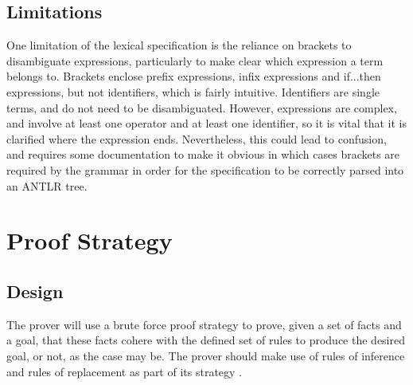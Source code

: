 \documentclass{l4proj}
\begin{document}


\subsection{Limitations}
One limitation of the lexical specification is the reliance on brackets to disambiguate expressions, particularly to make clear which expression a term belongs to. Brackets enclose prefix expressions, infix expressions and if...then expressions, but not identifiers, which is fairly intuitive. Identifiers are single terms, and do not need to be disambiguated. However, expressions are complex, and involve at least one operator and at least one identifier, so it is vital that it is clarified where the expression ends. Nevertheless, this could lead to confusion, and requires some documentation to make it obvious in which cases brackets are required by the grammar in order for the specification to be correctly parsed into an ANTLR tree. 

\section{Proof Strategy}



\subsection{Design}
The prover will use a brute force proof strategy to prove, given a set of facts and a goal, that these facts cohere with the defined set of rules to produce the desired goal, or not, as the case may be. The prover should make use of rules of inference and rules of replacement as part of its strategy \cite{infrules}. 
\end{document}
